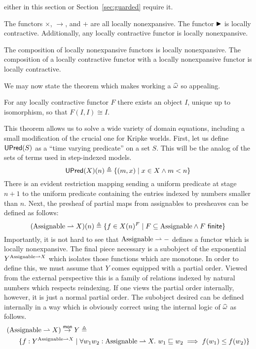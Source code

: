 either in this section or Section~\ref{sec:guarded} require it.
\begin{example}
  The functors $\times$, $\to$, and $+$ are all locally
  nonexpansive. The functor ${\blacktriangleright}$ is locally
  contractive. Additionally, any locally contractive functor is locally
  nonexpansive.
\end{example}
\begin{lem}
  The composition of locally nonexpansive functors is locally
  nonexpansive. The composition of a locally contractive functor with
  a locally nonexpansive functor is locally contractive.
\end{lem}
We may now state the theorem which makes working a
$\widehat{\omega}$ so appealing.
\begin{thm}\label{thm:steps:fixed-points}
  For any locally contractive functor $F$ there exists an object $I$,
  unique up to isomorphism, so that $F(I, I) \cong I$.
\end{thm}
This theorem allows us to solve a wide variety of domain equations,
including a small modification of the crucial one for Kripke
worlds. First, let us define $\mathsf{UPred}(S)$ as a ``time varying
predicate'' on a set $S$. This will be the analog of the sets of terms
used in step-indexed models.
\[
  \mathsf{UPred}(X)(n) \triangleq \{(m, x) \mid x \in X \land m < n\}
\]
There is an evident restriction mapping sending a uniform predicate at
stage $n + 1$ to the uniform predicate containing the entries indexed
by numbers smaller than $n$. Next, the presheaf of partial maps from
assignables to presheaves can be defined as follows:
\[
  (\assignables \pto X)(n) \triangleq
  \{f \in X(n)^{F} \mid F \subseteq \assignables \land F\ \mathsf{finite}\}
\]
Importantly, it is not hard to see that $\mathrm{Assignable} \rightharpoonup -$ defines
a functor which is locally nonexpansive. The final piece necessary is
a subobject of the exponential $Y^{\mathrm{Assignable} \rightharpoonup X}$ which
isolates those functions which are monotone. In order to define this,
we must assume that $Y$ comes equipped with a partial order. Viewed
from the external perspective this is a family of relations indexed by
natural numbers which respects reindexing. If one views the partial
order internally, however, it is just a normal partial order. The
subobject desired can be defined internally in a way which is
obviously correct using the internal logic of $\widehat{\omega}$ as
follows.
\begin{align*}
  (\mathrm{Assignable} \rightharpoonup X) \overset{\mathsf{mon}}{\to} Y &\triangleq \\
  \{f : Y^{\mathrm{Assignable} \rightharpoonup X} \mid{}&
   \forall w_1 w_2 : \mathrm{Assignable} \rightharpoonup X.\ w_1 \mathrel{\sqsubseteq} w_2 \implies f(w_1) \le f(w_2)\}
\end{align*}
